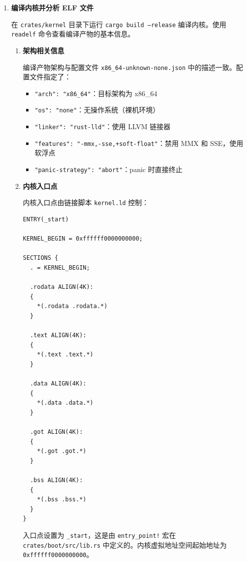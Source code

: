 \documentclass{SYSUReport}
\begin{document}
\begin{enumerate}[label={\chinese*、},labelsep=0pt]

    \item \textbf{编译内核并分析 ELF 文件}

    在 \texttt{crates/kernel} 目录下运行 \texttt{cargo build --release} 编译内核。使用 \texttt{readelf} 命令查看编译产物的基本信息。

    \begin{enumerate}[label = \arabic*、]
        \item \textbf{架构相关信息}

        编译产物架构与配置文件 \texttt{x86\_64-unknown-none.json} 中的描述一致。配置文件指定了：
        \begin{itemize}
            \item \texttt{"arch": "x86\_64"}：目标架构为 x86\_64
            \item \texttt{"os": "none"}：无操作系统（裸机环境）
            \item \texttt{"linker": "rust-lld"}：使用 LLVM 链接器
            \item \texttt{"features": "-mmx,-sse,+soft-float"}：禁用 MMX 和 SSE，使用软浮点
            \item \texttt{"panic-strategy": "abort"}：panic 时直接终止
        \end{itemize}

        \item \textbf{内核入口点}

        内核入口点由链接脚本 \texttt{kernel.ld} 控制：

        \begin{verbatim}
ENTRY(_start)

KERNEL_BEGIN = 0xffffff0000000000;

SECTIONS {
  . = KERNEL_BEGIN;

  .rodata ALIGN(4K):
  {
    *(.rodata .rodata.*)
  }

  .text ALIGN(4K):
  {
    *(.text .text.*)
  }

  .data ALIGN(4K):
  {
    *(.data .data.*)
  }

  .got ALIGN(4K):
  {
    *(.got .got.*)
  }

  .bss ALIGN(4K):
  {
    *(.bss .bss.*)
  }
}
        \end{verbatim}

        入口点设置为 \texttt{\_start}，这是由 \texttt{entry\_point!} 宏在 \texttt{crates/boot/src/lib.rs} 中定义的。内核虚拟地址空间起始地址为 \texttt{0xffffff0000000000}。


\end{enumerate}
\end{enumerate}
\end{document}
